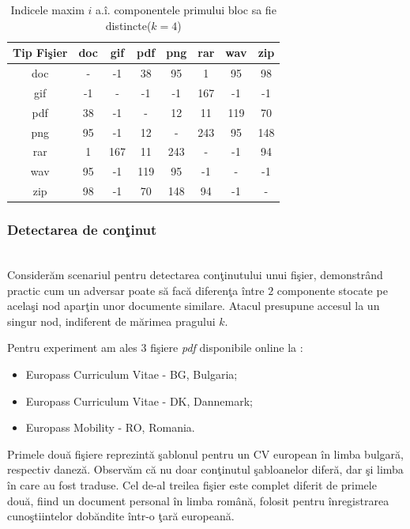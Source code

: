 \documentclass{llncs}
\begin{document}
\begin{table}[H]
\begin{center}
\caption{Indicele maxim $i$ a.\^{i}. componentele primului bloc sa fie distincte($k=4$)}\label{tb:margins}
\label{table:k4}
\begin{tabular}{cccccccc}
Tip Fi\c{s}ier & doc & gif & pdf & png & rar & wav & zip \\\hline
  doc & - & -1 & 38 & 95 & 1 & 95 & 98\\
  gif & -1 & - & -1 & -1 & 167 & -1 & -1\\
  pdf & 38 & -1 & - & 12 & 11 & 119 & 70\\
  png & 95 & -1 & 12 & - & 243 & 95 & 148\\
  rar & 1 & 167 & 11 & 243 & - & -1 & 94\\
  wav & 95 & -1 & 119 & 95 & -1 & - & -1\\
  zip & 98 & -1 & 70 & 148 & 94 & -1 & -\\ \hline
\end{tabular}
\end{center}
\bigskip
\end{table}

\subsubsection{Detectarea de con\c{t}inut} \hspace*{\fill} \\

Consider\u{a}m scenariul pentru detectarea con\c{t}inutului unui fi\c{s}ier, demonstr\^{a}nd practic cum un adversar poate s\u{a} fac\u{a} diferen\c{t}a \^{i}ntre $2$ componente stocate pe acela\c{s}i nod apar\c{t}in unor documente similare. Atacul presupune accesul la un singur nod, indiferent de m\u{a}rimea pragului $k$.

Pentru experiment am ales $3$ fi\c{s}iere \textit{pdf} disponibile online la {\cite{Europass:2015}}:
\begin{itemize}
  \item Europass Curriculum Vitae - BG, Bulgaria;
  \item Europass Curriculum Vitae - DK, Dannemark;
  \item Europass Mobility - RO, Romania.
\end{itemize}

Primele dou\u{a} fi\c{s}iere reprezint\u{a} \c{s}ablonul pentru un CV european \^{i}n limba bulgar\u{a}, respectiv danez\u{a}. Observ\u{a}m c\u{a} nu doar con\c{t}inutul \c{s}abloanelor difer\u{a}, dar \c{s}i limba \^{i}n care au fost traduse. Cel de-al treilea fi\c{s}ier este complet diferit de primele dou\u{a}, fiind un document personal \^{i}n limba rom\^{a}n\u{a}, folosit pentru \^{i}nregistrarea cuno\c{s}tiintelor dob\u{a}ndite \^{i}ntr-o \c{t}ar\u{a} european\u{a}.
\end{document}
